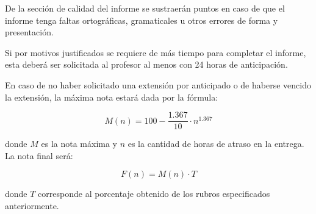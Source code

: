 \documentclass[12pt,letterpaper]{IEEEtran}
\begin{document}
De la sección de calidad del informe se sustraerán puntos en caso de que el informe tenga faltas ortográficas, gramaticales u otros errores de forma y presentación.

Si por motivos justificados se requiere de más tiempo para completar el informe, esta deberá ser solicitada al profesor al menos con 24 horas de anticipación.

En caso de no haber solicitado una extensión por anticipado o de haberse vencido la extensión, la máxima nota estará dada por la fórmula:

\[ M(n) = 100-\frac{1.367}{10}\cdot n^{1.367} \]

donde $M$ es la nota máxima y $n$ es la cantidad de horas de atraso en la entrega. La nota final será:

\[ F(n) = M(n)\cdot T \]

donde $T$ corresponde al porcentaje obtenido de los rubros especificados anteriormente.
\end{document}
